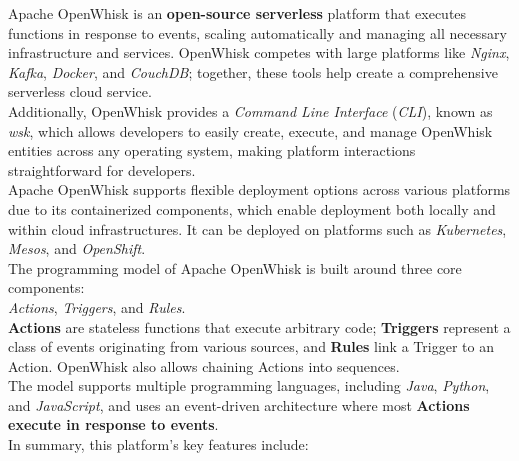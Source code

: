 Apache OpenWhisk is an \textbf{open-source serverless} platform that executes functions in response to events, scaling automatically and managing all necessary infrastructure and services. OpenWhisk competes with large platforms like \textit{Nginx}, \textit{Kafka}, \textit{Docker}, and \textit{CouchDB}; together, these tools help create a comprehensive serverless cloud service.\vspace{14pt}\\
Additionally, OpenWhisk provides a \textit{Command Line Interface} (\textit{CLI}), known as \textit{wsk}, which allows developers to easily create, execute, and manage OpenWhisk entities across any operating system, making platform interactions straightforward for developers.\vspace{14pt}\\
Apache OpenWhisk supports flexible deployment options across various platforms due to its containerized components, which enable deployment both locally and within cloud infrastructures. It can be deployed on platforms such as \textit{Kubernetes}, \textit{Mesos}, and \textit{OpenShift}.\vspace{14pt}\\
The programming model of Apache OpenWhisk is built around three core components:\\
\textit{Actions}, \textit{Triggers}, and \textit{Rules}.\vspace{14pt}\\
\textbf{Actions} are stateless functions that execute arbitrary code; \textbf{Triggers} represent a class of events originating from various sources, and \textbf{Rules} link a Trigger to an Action. OpenWhisk also allows chaining Actions into sequences.\vspace{14pt}\\
The model supports multiple programming languages, including \textit{Java}, \textit{Python}, and \textit{JavaScript}, and uses an event-driven architecture where most \textbf{Actions execute in response to events}.\cite{quevedo2019evaluating}\vspace{14pt}\\
In summary, this platform’s key features include\cite{huy2021crypto}:
